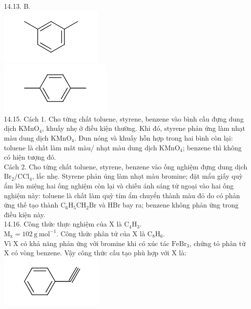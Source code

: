\documentclass[10pt]{article}
\begin{document}
14.13. B.\\
\includegraphics{smile-d148bf3b30bbcf35406876ca0731f9ff3cc75336}\\
\includegraphics{smile-cb2929419649cae8e79faa0ae0b2e5e67391466b}\\
14.15. Cách 1. Cho từng chất toluene, styrene, benzene vào bình cầu đựng dung dịch $\mathrm{KMnO}_{4}$, khuấy nhẹ ở điều kiện thường. Khi đó, styrene phản ứng làm nhạt màu dung dịch $\mathrm{KMnO}_{4}$. Đun nóng và khuấy hỗn hợp trong hai bình còn lại: toluene là chất làm mât màu/ nhạt màu dung dịch $\mathrm{KMnO}_{4}$; benzene thì không có hiện tượng đó.\\
Cách 2. Cho từng chất toluene, styrene, benzene vào ống nghiệm đựng dung dịch $\mathrm{Br}_{2} / \mathrm{CCl}_{4}$, lắc nhẹ. Styrene phản úng làm nhạt màu bromine; đặt mẩu giấy quỳ ẩm lên miệng hai ống nghiệm còn lại và chiếu ánh sáng tử ngoại vào hai ống nghiệm này: toluene là chất làm quỳ tím ẩm chuyển thành màu đỏ do có phản ứng thế tạo thành $\mathrm{C}_{6} \mathrm{H}_{5} \mathrm{CH}_{2} \mathrm{Br}$ và HBr bay ra; benzene không phản ứng trong điều kiện này.\\
14.16. Công thức thực nghiệm của X là $\mathrm{C}_{4} \mathrm{H}_{3}$.\\
$\mathrm{M}_{\mathrm{x}}=102 \mathrm{~g} \mathrm{~mol}^{-1}$. Công thức phân tử của X là $\mathrm{C}_{8} \mathrm{H}_{6}$.\\
Vì X có khả năng phản ứng với bromine khi có xúc tác $\mathrm{FeBr}_{3}$, chứng tỏ phân tử\\
X có vòng benzene. Vậy công thức cấu tạo phù hợp với X là:\\
\includegraphics{smile-5dee41d9c7ba97fe503d8c48a838edde71372713}
\end{document}
